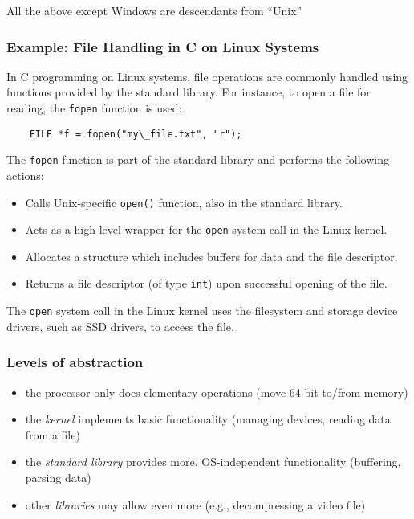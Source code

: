 \documentclass[12pt]{article}
\begin{document}
All the above except Windows are descendants from ``Unix''






\subsubsection{Example: File Handling in C on Linux Systems}
In C programming on Linux systems, file operations are commonly handled using functions provided by the standard library. For instance, to open a file for reading, the \texttt{fopen} function is used:
\begin{lstlisting}
    FILE *f = fopen("my\_file.txt", "r");    
\end{lstlisting}

The \texttt{fopen} function is part of the standard library and performs the following actions:

\begin{itemize}
    \item Calls Unix-specific \texttt{open()} function, also in the standard library.
    \item Acts as a high-level wrapper for the \texttt{open} system call in the Linux kernel.
    \item Allocates a structure which includes buffers for data and the file descriptor.
    \item Returns a file descriptor (of type \texttt{int}) upon successful opening of the file.
\end{itemize}

The \texttt{open} system call in the Linux kernel uses the filesystem and storage device drivers, such as SSD drivers, to access the file.

\subsubsection{Levels of abstraction}
\begin{itemize}
    \item the processor only does elementary operations (move 64-bit to/from memory)
    \item the \textit{kernel} implements basic functionality (managing devices, reading data from a file)
    \item the \textit{standard library} provides more, OS-independent functionality (buffering, parsing data)
    \item other \textit{libraries} may allow even more (e.g., decompressing a video file)
\end{itemize}
\end{document}
